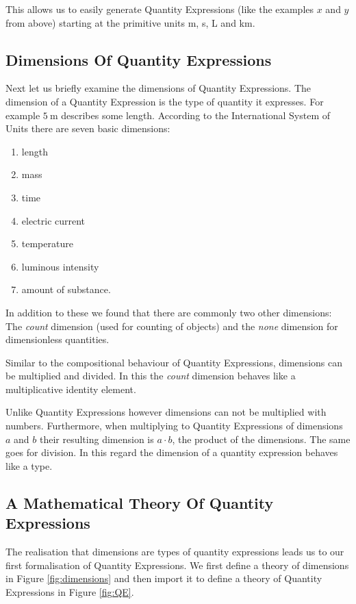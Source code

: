 This allows us to easily generate Quantity Expressions (like the examples $x$ and $y$ from above) starting at the primitive units m, s, L and km.

\subsection{Dimensions Of Quantity Expressions}
Next let us briefly examine the dimensions of Quantity Expressions. The dimension of a Quantity Expression is the type of quantity it expresses. For example $5\ \text{m}$ describes some length. According to the International System of Units \cite{sispec} there are seven basic dimensions:
\begin{enumerate}
  \item length
  \item mass
  \item time
  \item electric current
  \item temperature
  \item luminous intensity
  \item amount of substance.
\end{enumerate}

In addition to these we found that there are commonly two other dimensions: The \textit{count} dimension (used for counting of objects) and the \textit{none} dimension for dimensionless quantities.

Similar to the compositional behaviour of Quantity Expressions, dimensions can be multiplied and divided. In this the \textit{count} dimension behaves like a multiplicative identity element.

Unlike Quantity Expressions however dimensions can not be multiplied with numbers. Furthermore, when multiplying to Quantity Expressions of dimensions $a$ and $b$ their resulting dimension is $a \cdot{} b$, the product of the dimensions. The same goes for division. In this regard the dimension of a quantity expression behaves like a type.

\subsection{A Mathematical Theory Of Quantity Expressions}
\label{sec:qeform}

The realisation that dimensions are types of quantity expressions leads us to our first formalisation of Quantity Expressions. We first define a theory of dimensions in Figure \ref{fig:dimensions} and then import it to define a theory of Quantity Expressions in Figure \ref{fig:QE}.

